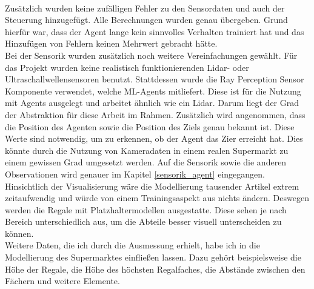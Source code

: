 \\
Zusätzlich wurden keine zufälligen Fehler zu den Sensordaten und auch der Steuerung hinzugefügt. Alle Berechnungen wurden genau übergeben. Grund hierfür war, dass der Agent lange kein sinnvolles Verhalten trainiert hat und das Hinzufügen von Fehlern keinen Mehrwert gebracht hätte.
\\
Bei der Sensorik wurden zusätzlich noch weitere Vereinfachungen gewählt. Für das Projekt wurden keine realistisch funktionierenden Lidar- oder Ultraschallwellensensoren benutzt. Stattdessen wurde die Ray Perception Sensor Komponente verwendet, welche ML-Agents mitliefert. Diese ist für die Nutzung mit Agents ausgelegt und arbeitet ähnlich wie ein Lidar. Darum liegt der Grad der Abstraktion für diese Arbeit im Rahmen. Zusätzlich wird angenommen, dass die Position des Agenten sowie die Position des Ziels genau bekannt ist. Diese Werte sind notwendig, um zu erkennen, ob der Agent das Zier erreicht hat. Dies könnte durch die Nutzung von Kameradaten in einem realen Supermarkt zu einem gewissen Grad umgesetzt werden. Auf die Sensorik sowie die anderen Observationen wird genauer im Kapitel \ref{sensorik_agent} eingegangen.
\\
Hinsichtlich der Visualisierung wäre die Modellierung tausender Artikel extrem zeitaufwendig und würde von einem Trainingsaspekt aus nichts ändern. Deswegen werden die Regale mit Platzhaltermodellen ausgestatte. Diese sehen je nach Bereich unterschiedlich aus, um die Abteile besser visuell unterscheiden zu können. 
\\
Weitere Daten, die ich durch die Ausmessung erhielt, habe ich in die Modellierung des Supermarktes einfließen lassen. Dazu gehört beispielsweise die Höhe der Regale, die Höhe des höchsten Regalfaches, die Abstände zwischen den Fächern und weitere Elemente.
